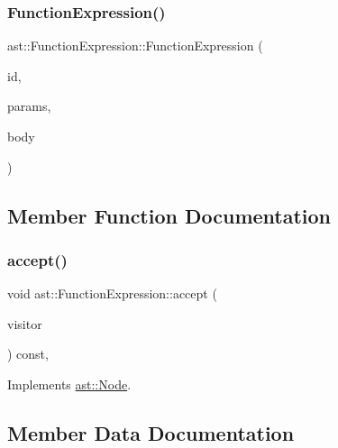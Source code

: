 \subsubsection{\texorpdfstring{Function\+Expression()}{FunctionExpression()}}
{\footnotesize\ttfamily ast\+::\+Function\+Expression\+::\+Function\+Expression (\begin{DoxyParamCaption}\item[{\hyperlink{structast_1_1_identifier}{Identifier} $\ast$}]{id,  }\item[{\hyperlink{structast_1_1_formal_parameter_list}{Formal\+Parameter\+List} $\ast$}]{params,  }\item[{\hyperlink{structast_1_1_function_body}{Function\+Body} $\ast$}]{body }\end{DoxyParamCaption})\hspace{0.3cm}{\ttfamily [inline]}}



\subsection{Member Function Documentation}
\mbox{\label{structast_1_1_function_expression_aa847bb46bcd639d92e0fd2bc0bcf0a3f}} 
\subsubsection{\texorpdfstring{accept()}{accept()}}
{\footnotesize\ttfamily void ast\+::\+Function\+Expression\+::accept (\begin{DoxyParamCaption}\item[{\hyperlink{structast_1_1_visitor}{Visitor} \&}]{visitor }\end{DoxyParamCaption}) const\hspace{0.3cm}{\ttfamily [inline]}, {\ttfamily [virtual]}}



Implements \hyperlink{structast_1_1_node_abc089ee6caaf06a4445ebdd8391fdebc}{ast\+::\+Node}.



\subsection{Member Data Documentation}
\mbox{\label{structast_1_1_function_expression_a708305d4b4f5421d1dfcbe5edb15374c}} 
